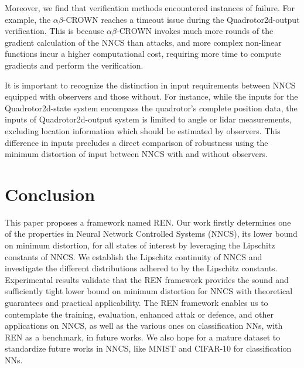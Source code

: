 \documentclass[conference]{IEEEtran}
\newcommand{\abcrown}{$\alpha\beta$-CROWN\xspace}
\newcommand{\ren}{\textsc{REN}\xspace}
\newcommand{\nncs}{\textsc{NNCS}\xspace}
\begin{document}
Moreover, we find that verification methods 
encountered instances of failure. 
For example, the \abcrown reaches a 
timeout issue during the Quadrotor2d-output 
verification. This is because \abcrown invokes 
much more rounds of the gradient calculation 
of the \nncs than attacks, and more complex non-linear 
functions incur a higher computational cost, requiring more 
time to compute gradients and perform the verification. 

It is important to recognize the distinction 
in input requirements between \nncs equipped with observers 
and those without. For instance, 
while the inputs for the Quadrotor2d-state system 
encompass the quadrotor's complete position data, 
the inputs of Quadrotor2d-output system is limited to angle or 
lidar measurements, excluding location information which 
should be estimated by observers. 
This difference in inputs precludes a 
direct comparison of robustness using the 
minimum distortion of input between \nncs with and 
without observers.





\section{Conclusion}
\label{sec:conclusion}

This paper proposes a framework named \ren. 
Our work firstly determines one of the properties 
in Neural Network Controlled 
Systems (\nncs), its lower bound on 
minimum distortion, for all states of 
interest by leveraging the Lipschitz constants 
of \nncs. We establish the Lipschitz continuity 
of \nncs and investigate the different distributions 
adhered to by the Lipschitz constants. 
Experimental results validate that the 
\ren framework provides the sound and 
sufficiently tight lower bound 
on minimum distortion for \nncs with theoretical 
guarantees and practical applicability. 
The \ren framework 
enables us to contemplate the training, 
evaluation, enhanced attak or defence, and other 
applications on \nncs, 
as well as the various 
ones on classification NNs, 
with \ren as a benchmark, 
in future works. 
We also hope for a mature dataset to 
standardize future works in \nncs, 
like MNIST and CIFAR-10 for 
classification NNs.
\clearpage


\end{document}
